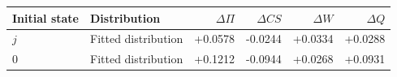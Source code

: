 \begin{tabular}{llrrrr}\toprule
Initial state & Distribution & $\Delta\Pi$ & $\Delta CS$ & $\Delta W$ & $\Delta Q$\\\midrule
$j$ & Fitted distribution & +0.0578 & -0.0244 & +0.0334 & +0.0288 \\
$0$ & Fitted distribution & +0.1212 & -0.0944 & +0.0268 & +0.0931 \\
\bottomrule\end{tabular}

